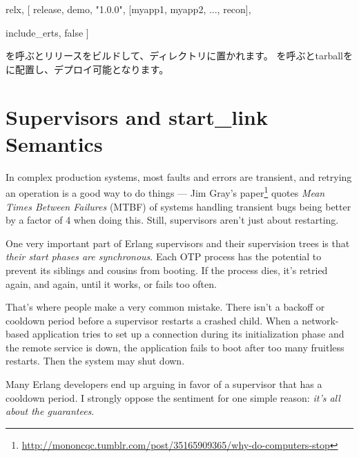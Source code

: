 \begin{VerbatimText}
{relx, [
  {release, {demo, "1.0.0"},
    [myapp1, myapp2, ..., recon]},
     
  {include_erts, false} %
]}
\end{VerbatimText}

を呼ぶとリリースをビルドして、ディレクトリに置かれます。
を呼ぶとtarballをに配置し、デプロイ可能となります。

\section{Supervisors and start\_link Semantics}
\label{sec:supervisors-and-start-link-semantics}

In complex production systems, most faults and errors are transient, and retrying an operation is a good way to do things — Jim Gray's paper\footnote{\href{http://mononcqc.tumblr.com/post/35165909365/why-do-computers-stop}{http://mononcqc.tumblr.com/post/35165909365/why-do-computers-stop}} quotes \emph{Mean Times Between Failures} (MTBF) of systems handling transient bugs being better by a factor of 4 when doing this. Still, supervisors aren't just about restarting.

One very important part of Erlang supervisors and their supervision trees is that \emph{their start phases are synchronous}. Each OTP process has the potential to prevent its siblings and cousins from booting. If the process dies, it's retried again, and again, until it works, or fails too often.

That's where people make a very common mistake. There isn't a backoff or cooldown period before a supervisor restarts a crashed child. When a network-based application tries to set up a connection during its initialization phase and the remote service is down, the application fails to boot after too many fruitless restarts. Then the system may shut down.

Many Erlang developers end up arguing in favor of a supervisor that has a cooldown period. I strongly oppose the sentiment for one simple reason: \emph{it's all about the guarantees}.

